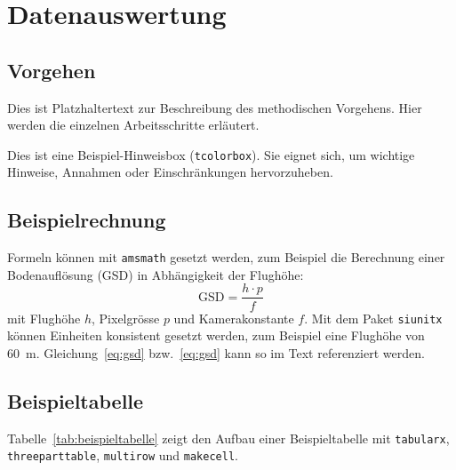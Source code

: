 \section{Datenauswertung}
\label{sec:methodik}

\subsection{Vorgehen}
\label{subsec:vorgehen}
Dies ist Platzhaltertext zur Beschreibung des methodischen Vorgehens. Hier werden die
einzelnen Arbeitsschritte erläutert.

\begin{tcolorbox}[myboxstyle, title=Hinweis]
Dies ist eine Beispiel-Hinweisbox (\texttt{tcolorbox}). Sie eignet sich, um wichtige
Hinweise, Annahmen oder Einschränkungen hervorzuheben.
\end{tcolorbox}

\subsection{Beispielrechnung}
\label{subsec:beispielrechnung}
Formeln können mit \texttt{amsmath} gesetzt werden, zum Beispiel die Berechnung einer
Bodenauflösung (GSD) in Abhängigkeit der Flughöhe:
\begin{equation}
    \text{GSD} = \frac{h \cdot p}{f}
    \label{eq:gsd}
\end{equation}
mit Flughöhe $h$, Pixelgrösse $p$ und Kamerakonstante $f$. Mit dem Paket \texttt{siunitx}
können Einheiten konsistent gesetzt werden, zum Beispiel eine Flughöhe von \SI{60}{\meter}.
Gleichung~\ref{eq:gsd} bzw.\ \cref{eq:gsd} kann so im Text referenziert werden.

\subsection{Beispieltabelle}
\label{subsec:beispieltabelle}
Tabelle~\ref{tab:beispieltabelle} zeigt den Aufbau einer Beispieltabelle mit
\texttt{tabularx}, \texttt{threeparttable}, \texttt{multirow} und \texttt{makecell}.

